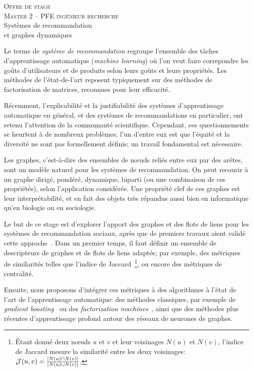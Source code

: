 \documentclass[a4paper, 12pt]{article}
\newcommand{\dest}{ 
    \textsc{\Large Offre de stage \\ 
    Master 2 -- PFE ingénieur recherche}\\[1ex]
    {\Huge Systèmes de recommandation \\
    et graphes dynamiques}
  }
\begin{document}
\pagestyle{fancy} 

\addvspace{1cm}
\begin{center}
  \dest
\end{center}

\addvspace{1cm}

Le terme de {\em système de recommandation} regroupe l'ensemble des tâches d'apprentissage automatique ({\em machine learning}) où l'on veut faire correpondre les goûts d'utilisateurs et de produits selon leurs goûts et leurs propriétés. 
Les méthodes de l'état-de-l'art reposent typiquement sur des méthodes de factorisation de matrices, reconnues pour leur efficacité.

Récemment, l'explicabilité et la justifiabilité des systèmes d'apprentissage automatique en général, et des systèmes de recommandations en particulier, ont retenu l'attention de la communauté scientifique.
Cependant, ces questionnements se heurtent à de nombreux problèmes; l'un d'entre eux est que l'équité et la diversité ne sont pas formellement définis; un travail fondamental est nécessaire.

Les graphes, c'est-à-dire des ensembles de n\oe{}uds reliés entre eux par des arêtes, sont un modèle naturel pour les systèmes de recommandation.
On peut recourir à un graphe dirigé, pondéré, dynamique, biparti (ou une combinaison de ces propriétés), selon l'application considérée.
Une propriété clef de ces graphes est leur interprétabilité, et en fait des objets très répandus aussi bien en informatique qu'en biologie ou en sociologie.

Le but de ce stage est d'explorer l'apport des graphes et des flots de liens pour les systèmes de recommandation sociaux, après que de premiers travaux aient validé cette approche~\cite{viard2018augmenting}.
Dans un premier temps, il faut définir un ensemble de descripteurs de graphes et de flots de liens adaptés; par exemple, des métriques de similarités telles que l'indice de Jaccard~\footnote{Étant donné deux n\oe{}uds $u$ et $v$ et leur voisinages $N(u)$ et $N(v)$, l'indice de Jaccard mesure la similarité entre les deux voisinages: ${\cal J}(u,v) = \frac{|N(u)\cap N(v)|}{|N(u) \cup N(v)|}$.}, ou encore des métriques de centralité.

Ensuite, nous proposons d'intégrer ces métriques à des algorithmes à l'état de l'art de l'apprentissage automatique: des méthodes classiques, par exemple de {\em gradient boosting}~\cite{friedman2001greedy} ou des {\em factorization machines}~\cite{rendle2010factorization}, ainsi que des méthodes plus récentes d'apprentissage profond autour des réseaux de neurones de graphes.
\end{document}
